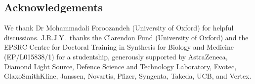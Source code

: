 \documentclass[a4paper,12pt]{article}
\newcommand{\meshort}{J.R.J.Y.}
\begin{document}
\begin{refsection}
\section*{Acknowledgements}

We thank Dr Mohammadali Foroozandeh (University of Oxford) for helpful discussions.
\meshort{}\ thanks the Clarendon Fund (University of Oxford) and the EPSRC Centre for Doctoral Training in Synthesis for Biology and Medicine (EP/L015838/1) for a studentship, generously supported by AstraZeneca, Diamond Light Source, Defence Science and Technology Laboratory, Evotec, GlaxoSmithKline, Janssen, Novartis, Pfizer, Syngenta, Takeda, UCB, and Vertex.

\AtNextBibliography{\small}
\printbibliography{}
\end{refsection}


\end{document}
